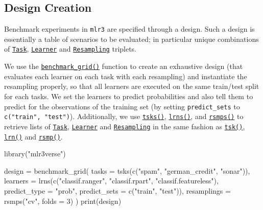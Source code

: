 \documentclass[
]{scrbook}
\newenvironment{Shaded}{\begin{snugshade}}{\end{snugshade}}
\newcommand{\AttributeTok}[1]{\textcolor[rgb]{0.77,0.63,0.00}{#1}}
\newcommand{\DecValTok}[1]{\textcolor[rgb]{0.00,0.00,0.81}{#1}}
\newcommand{\FunctionTok}[1]{\textcolor[rgb]{0.00,0.00,0.00}{#1}}
\newcommand{\NormalTok}[1]{#1}
\newcommand{\OtherTok}[1]{\textcolor[rgb]{0.56,0.35,0.01}{#1}}
\newcommand{\StringTok}[1]{\textcolor[rgb]{0.31,0.60,0.02}{#1}}
\renewenvironment{Shaded} {\begin{snugshade}\small} {\end{snugshade}}
\begin{document}
\hypertarget{bm-design}{%
\subsection{Design Creation}\label{bm-design}}

Benchmark experiments in \texttt{mlr3} are specified through a design.
Such a design is essentially a table of scenarios to be evaluated; in particular unique combinations of \href{https://mlr3.mlr-org.com/reference/Task.html}{\texttt{Task}}, \href{https://mlr3.mlr-org.com/reference/Learner.html}{\texttt{Learner}} and \href{https://mlr3.mlr-org.com/reference/Resampling.html}{\texttt{Resampling}} triplets.

We use the \href{https://mlr3.mlr-org.com/reference/benchmark_grid.html}{\texttt{benchmark\_grid()}} function to create an exhaustive design (that evaluates each learner on each task with each resampling) and instantiate the resampling properly, so that all learners are executed on the same train/test split for each tasks.
We set the learners to predict probabilities and also tell them to predict for the observations of the training set (by setting \texttt{predict\_sets} to \texttt{c("train",\ "test")}).
Additionally, we use \href{https://mlr3.mlr-org.com/reference/mlr_sugar.html}{\texttt{tsks()}}, \href{https://mlr3.mlr-org.com/reference/mlr_sugar.html}{\texttt{lrns()}}, and \href{https://mlr3.mlr-org.com/reference/mlr_sugar.html}{\texttt{rsmps()}} to retrieve lists of \href{https://mlr3.mlr-org.com/reference/Task.html}{\texttt{Task}}, \href{https://mlr3.mlr-org.com/reference/Learner.html}{\texttt{Learner}} and \href{https://mlr3.mlr-org.com/reference/Resampling.html}{\texttt{Resampling}} in the same fashion as \href{https://mlr3.mlr-org.com/reference/mlr_sugar.html}{\texttt{tsk()}}, \href{https://mlr3.mlr-org.com/reference/mlr_sugar.html}{\texttt{lrn()}} and \href{https://mlr3.mlr-org.com/reference/mlr_sugar.html}{\texttt{rsmp()}}.

\begin{Shaded}
\begin{Highlighting}[]
\FunctionTok{library}\NormalTok{(}\StringTok{"mlr3verse"}\NormalTok{)}

\NormalTok{design }\OtherTok{=} \FunctionTok{benchmark\_grid}\NormalTok{(}
  \AttributeTok{tasks =} \FunctionTok{tsks}\NormalTok{(}\FunctionTok{c}\NormalTok{(}\StringTok{"spam"}\NormalTok{, }\StringTok{"german\_credit"}\NormalTok{, }\StringTok{"sonar"}\NormalTok{)),}
  \AttributeTok{learners =} \FunctionTok{lrns}\NormalTok{(}\FunctionTok{c}\NormalTok{(}\StringTok{"classif.ranger"}\NormalTok{, }\StringTok{"classif.rpart"}\NormalTok{, }\StringTok{"classif.featureless"}\NormalTok{),}
    \AttributeTok{predict\_type =} \StringTok{"prob"}\NormalTok{, }\AttributeTok{predict\_sets =} \FunctionTok{c}\NormalTok{(}\StringTok{"train"}\NormalTok{, }\StringTok{"test"}\NormalTok{)),}
  \AttributeTok{resamplings =} \FunctionTok{rsmps}\NormalTok{(}\StringTok{"cv"}\NormalTok{, }\AttributeTok{folds =} \DecValTok{3}\NormalTok{)}
\NormalTok{)}
\FunctionTok{print}\NormalTok{(design)}
\end{Highlighting}
\end{Shaded}
\end{document}
